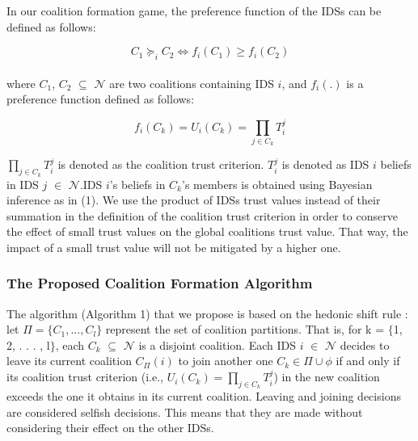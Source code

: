 \documentclass[conference]{IEEEtran}
\begin{document}
In our coalition formation game, the preference
function of the IDSs can be defined as follows:

\begin{equation}
C_{1} \succeq_{i} C_{2} \Longleftrightarrow f_{i}(C_{1}) \geq f_{i}(C_{2})
\end{equation} \\

where $C_{1}$, $C_{2}$ $\subseteq$ $\mathcal{N}$ are two coalitions containing IDS $i$, and
$f_{i}(.)$ is a preference function defined as follows:

\begin{equation}
f_{i}(C_{k}) = U_{i}(C_{k}) = \prod _{j\in C_{k}} T_{i}^{j}
\end{equation}

$\prod _{j\in C _{k}} T_{i}^{j}$ is denoted as the coalition trust criterion. $T_{i}^{j}$ is denoted as IDS $i$ beliefs in IDS $j$ $\in$ $\mathcal{N}$.IDS $i$'s beliefs in $C_{k}$'s members is obtained using Bayesian inference as in (1). We use
the product of IDSs trust values instead of their summation in the definition of the coalition trust criterion in order to conserve the effect of small trust values on the global coalitions trust value. That way, the impact of a small trust value will not be mitigated by a higher one.


\subsubsection{The Proposed Coalition Formation Algorithm}

 The algorithm (Algorithm 1) that we propose is based on the hedonic shift rule \cite{bogomolnaia2002stability}: let
$\Pi = \{C_{1}, . . . , C_{l}\}$ represent the set of coalition partitions. That is, for k = $\{$1, 2, . . . , l$\}$, each $C_{k}$ $\subseteq$ $\mathcal{N}$ is a disjoint coalition. Each IDS $i$ $\in$ $\mathcal{N}$ decides to leave its current
coalition $C_{\Pi}(i)$ to join another one $C_{k} \in \Pi \cup \phi$ if and
only if its coalition trust criterion (i.e., $U_{i}(C_{k}) = \prod _{j\in C_{k}} T_{i}^{j}$) in
the new coalition exceeds the one it obtains in its
current coalition. Leaving and joining decisions are considered selfish decisions. This  means that they are made without considering their effect on the other IDSs.


\end{document}
